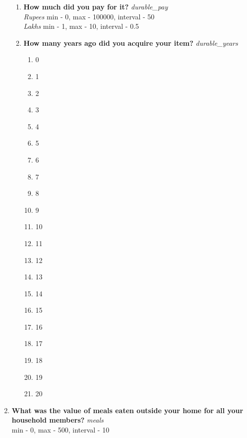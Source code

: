 \documentclass{article}
\begin{document}
\begin{enumerate}
\begin{enumerate}[label*=\arabic*.]
\item {\bfseries How much did you pay for it?}\emph{ durable\_pay } 
\\ \emph{ Rupees }min - 0, max - 100000, interval - 50 
\\ \emph{ Lakhs }min - 1, max - 10, interval - 0.5 
 
\item {\bfseries How many years ago did you acquire your item?}\emph{ durable\_years } 
\begin{enumerate} 
\item 0 
\item 1 
\item 2 
\item 3 
\item 4 
\item 5 
\item 6 
\item 7 
\item 8 
\item 9 
\item 10 
\item 11 
\item 12 
\item 13 
\item 14 
\item 15 
\item 16 
\item 17 
\item 18 
\item 19 
\item 20 
\end{enumerate} 
\end{enumerate} 
\item {\bfseries What was the value of meals eaten outside your home for all your household members?}\emph{ meals } 
\\min - 0, max - 500, interval - 10 
 

\end{enumerate}
\end{document}
